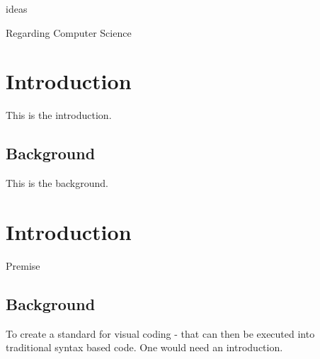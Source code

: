 ideas

Regarding Computer Science

\section{Introduction}
This is the introduction.
\subsection{Background}
This is the background.

\section{Introduction}
Premise
\subsection{Background}
To create a standard for visual coding - that can then be executed into traditional syntax based code.
One would need an introduction. 